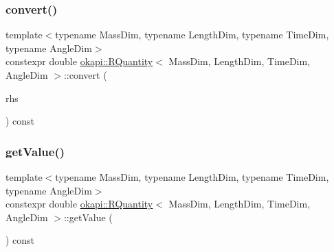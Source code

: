\mbox{\label{classokapi_1_1RQuantity_a95fa648c9647728389cc4180c8312cc1}} 
\subsubsection{\texorpdfstring{convert()}{convert()}}
{\footnotesize\ttfamily template$<$typename Mass\+Dim, typename Length\+Dim, typename Time\+Dim, typename Angle\+Dim$>$ \\
constexpr double \mbox{\hyperlink{classokapi_1_1RQuantity}{okapi\+::\+R\+Quantity}}$<$ Mass\+Dim, Length\+Dim, Time\+Dim, Angle\+Dim $>$\+::convert (\begin{DoxyParamCaption}\item[{const \mbox{\hyperlink{classokapi_1_1RQuantity}{R\+Quantity}}$<$ Mass\+Dim, Length\+Dim, Time\+Dim, Angle\+Dim $>$ \&}]{rhs }\end{DoxyParamCaption}) const\hspace{0.3cm}{\ttfamily [inline]}}

\mbox{\label{classokapi_1_1RQuantity_ab3938e34d6e56f0b3352c777832e7cbe}} 
\subsubsection{\texorpdfstring{getValue()}{getValue()}}
{\footnotesize\ttfamily template$<$typename Mass\+Dim, typename Length\+Dim, typename Time\+Dim, typename Angle\+Dim$>$ \\
constexpr double \mbox{\hyperlink{classokapi_1_1RQuantity}{okapi\+::\+R\+Quantity}}$<$ Mass\+Dim, Length\+Dim, Time\+Dim, Angle\+Dim $>$\+::get\+Value (\begin{DoxyParamCaption}{ }\end{DoxyParamCaption}) const\hspace{0.3cm}{\ttfamily [inline]}}

